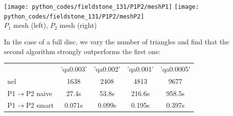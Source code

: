 \begin{center}
\texttt{[image: python\_codes/fieldstone\_131/P1P2/meshP1]}
\texttt{[image: python\_codes/fieldstone\_131/P1P2/meshP2]}\\
{\captionfont $P_1$ mesh (left), $P_2$ mesh (right)}
\end{center}

In the case of a full disc, we vary the number of triangles and find that 
the second algorithm strongly outperforms the first one:
 
\begin{center}
\begin{tabular}{|l|c|c|c|c|}
\hline
                       & 'qa0.003' & 'qa0.002' & 'qa0.001' & 'qa0.0005' \\
nel                    & 1638      & 2408      & 4813 &  9677\\
\hline
P1$\rightarrow$P2 naive& 27.4s      & 53.8s     & 216.6s & 958.5s\\
P1$\rightarrow$P2 smart& 0.071s     & 0.099s    & 0.195s & 0.397s\\
\hline
\end{tabular}
\end{center}




